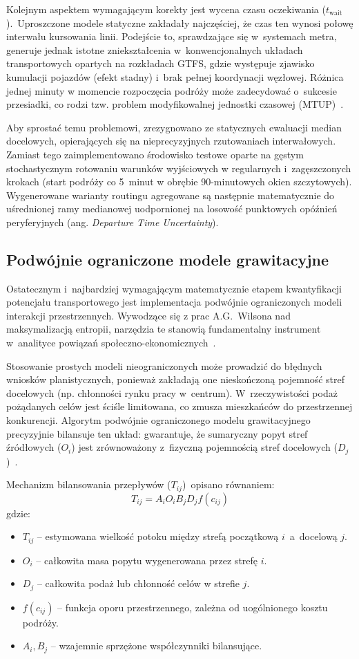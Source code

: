 \documentclass{pracamgr}
\begin{document}
Kolejnym aspektem wymagającym korekty jest wycena czasu oczekiwania ($t_{\text{wait}}$).~Uproszczone modele statyczne zakładały najczęściej, że czas ten wynosi połowę interwału kursowania linii. Podejście to, sprawdzające się w~systemach metra, generuje jednak istotne zniekształcenia w~konwencjonalnych układach transportowych opartych na rozkładach GTFS, gdzie występuje zjawisko kumulacji pojazdów (efekt stadny) i~brak pełnej koordynacji węzłowej. Różnica jednej minuty w momencie rozpoczęcia podróży może zadecydować o~sukcesie przesiadki, co rodzi tzw. problem modyfikowalnej jednostki czasowej (MTUP)~\cite{LUO2019102505, metropolitan}.

Aby sprostać temu problemowi, zrezygnowano ze statycznych ewaluacji median docelowych, opierających się na nieprecyzyjnych rzutowaniach interwałowych. Zamiast tego zaimplementowano środowisko testowe oparte na gęstym stochastycznym rotowaniu warunków wyjściowych w regularnych i~zagęszczonych krokach (start podróży co 5~minut w obrębie 90-minutowych okien szczytowych). Wygenerowane warianty routingu agregowane są następnie matematycznie do uśrednionej ramy medianowej uodpornionej na losowość punktowych opóźnień peryferyjnych (ang. \textit{Departure Time Uncertainty}).

\subsection{Podwójnie ograniczone modele grawitacyjne}

Ostatecznym i~najbardziej wymagającym matematycznie etapem kwantyfikacji potencjału transportowego jest implementacja podwójnie ograniczonych modeli interakcji przestrzennych. Wywodzące się z prac A.G.~Wilsona nad maksymalizacją entropii, narzędzia te stanowią fundamentalny instrument w~analityce powiązań społeczno-ekonomicznych~\cite{gravity, gravity2}.

Stosowanie prostych modeli nieograniczonych może prowadzić do błędnych wniosków planistycznych, ponieważ zakładają one nieskończoną pojemność stref docelowych (np. chłonności rynku pracy w~centrum). W~rzeczywistości podaż pożądanych celów jest ściśle limitowana, co zmusza mieszkańców do przestrzennej konkurencji. Algorytm podwójnie ograniczonego modelu grawitacyjnego precyzyjnie bilansuje ten układ: gwarantuje, że sumaryczny popyt stref źródłowych ($O_i$) jest zrównoważony z~fizyczną pojemnością stref docelowych ($D_j$)~\cite{gravity2}.

Mechanizm bilansowania przepływów ($T_{ij}$)~opisano równaniem:
$$T_{ij} = A_i O_i B_j D_j f(c_{ij})$$
gdzie:
\begin{itemize}
    \item $T_{ij}$ – estymowana wielkość potoku między strefą początkową $i$~a~docelową $j$.
    \item $O_i$ – całkowita masa popytu wygenerowana przez strefę $i$.
    \item $D_j$ – całkowita podaż lub chłonność celów w strefie $j$.
    \item $f(c_{ij})$ – funkcja oporu przestrzennego, zależna od uogólnionego kosztu podróży.
    \item $A_i, B_j$ – wzajemnie sprzężone współczynniki bilansujące.
\end{itemize}
\end{document}

